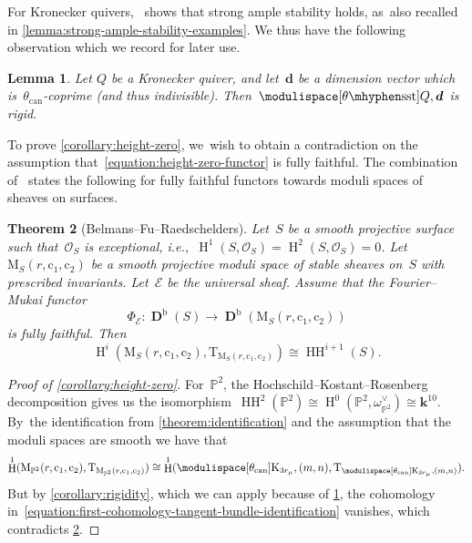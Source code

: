 \documentclass[JEP,XML,SOM,Unicode,NoEqCountersInSection,published]{cedram}
\theoremstyle{plain}
\newtheorem{theorem}{Theorem}[section]
\newtheorem{lemma}[theorem]{Lemma}
\theoremstyle{definition}
\DeclareMathOperator\derived{\mathbf{D}}
\DeclareMathOperator\HH{H}
\DeclareMathOperator\hochschild{HH}
\newcommand\bounded{\ensuremath{\mathrm{b}}}
\newcommand\can{\ensuremath{\mathrm{can}}}
\newcommand\field{\mathbf{k}}
\newcommand\moduli{\ensuremath{\mathrm{M}}}
\newcommand\semistable{\ensuremath{\mhyphen\mathrm{sst}}}
\newcommand\tangent{\ensuremath{\mathrm{T}}}
\newcommand\tuple[1]{\ensuremath{{\boldsymbol{#1}}}}
\begin{document}
For Kronecker quivers,~\cite[Prop.\,6.2]{MR3683503}
shows that strong ample stability holds, as~also recalled in \cref{lemma:strong-ample-stability-examples}.
We thus have the following observation which we record for later use.

\begin{lemma}
\label{lemma:rigidity-kronecker-quivers}
Let $Q$ be a Kronecker quiver,
and let~$\tuple{d}$ be a dimension vector
which is~$\theta_\can$-coprime (and thus indivisible).
Then~$\modulispace[\theta\semistable]{Q,\tuple{d}}$ is rigid.
\end{lemma}

To prove \cref{corollary:height-zero}, we~wish to obtain a contradiction on the assumption that~\eqref{equation:height-zero-functor} is fully faithful.
The combination of~\cite[Prop.\,29, Rem.\,30]{MR3950704} states the following
for fully faithful functors towards moduli spaces of sheaves on surfaces.
\begin{theorem}[Belmans--Fu--Raedschelders]
\label{theorem:fully-faithful-hochschild-cohomology}
Let~$S$ be a smooth projective surface
such that~$\mathcal{O}_S$ is exceptional,
i.e.,~$\HH^1(S,\mathcal{O}_S)=\HH^2(S,\mathcal{O}_S)=0$.
Let~$\moduli_S(r,\mathrm{c}_1,\mathrm{c}_2)$ be a smooth projective moduli space
of stable sheaves on~$S$ with prescribed invariants.
Let~$\mathcal{E}$ be the universal sheaf.
Assume that the Fourier--Mukai functor
\begin{equation*}
\Phi_{\mathcal{E}}\colon\derived^\bounded(S)\to\derived^\bounded(\moduli_S(r,\mathrm{c}_1,\mathrm{c}_2))
\end{equation*}
is fully faithful.
Then
\begin{equation*}
\HH^i(\moduli_S(r,\mathrm{c}_1,\mathrm{c}_2),\tangent_{\moduli_S(r,\mathrm{c}_1,\mathrm{c}_2)})
\cong
\hochschild^{i+1}(S).
\end{equation*}
\end{theorem}

\begin{proof}[Proof of \cref{corollary:height-zero}]
For~$\mathbb{P}^2$,
the Hochschild--Kostant--Rosenberg decomposition
gives us the isomorphism~$\hochschild^2(\mathbb{P}^2)\cong\HH^0(\mathbb{P}^2,\omega_{\mathbb{P}^2}^\vee)\cong\field^{10}$. By~the identification from \cref{theorem:identification}
and the assumption that the moduli spaces are smooth
we have that
\begin{equation}
\label{equation:first-cohomology-tangent-bundle-identification}
\HH^1(\moduli_{\mathbb{P}^2}(r,\mathrm{c}_1,\mathrm{c}_2),\tangent_{\moduli_{\mathbb{P}^2}(r,\mathrm{c}_1,\mathrm{c}_2)})
\cong
\HH^1(\modulispace[\theta_\can]{\mathrm{K}_{3r_\mu},(m,n)},\tangent_{\modulispace[\theta_\can]{\mathrm{K}_{3r_\mu},(m,n)}}).
\end{equation}
But by \cref{corollary:rigidity},
which we can apply because of \cref{lemma:rigidity-kronecker-quivers},
the cohomology in~\eqref{equation:first-cohomology-tangent-bundle-identification} vanishes,
which contradicts \cref{theorem:fully-faithful-hochschild-cohomology}.
\end{proof}
\end{document}
